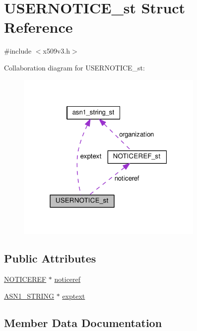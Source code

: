 \hypertarget{struct_u_s_e_r_n_o_t_i_c_e__st}{}\section{U\+S\+E\+R\+N\+O\+T\+I\+C\+E\+\_\+st Struct Reference}
\label{struct_u_s_e_r_n_o_t_i_c_e__st}


{\ttfamily \#include $<$x509v3.\+h$>$}



Collaboration diagram for U\+S\+E\+R\+N\+O\+T\+I\+C\+E\+\_\+st\+:
\nopagebreak
\begin{figure}[H]
\begin{center}
\leavevmode
\includegraphics[width=256pt]{struct_u_s_e_r_n_o_t_i_c_e__st__coll__graph}
\end{center}
\end{figure}
\subsection*{Public Attributes}
\begin{DoxyCompactItemize}
\item 
\hyperlink{x509v3_8h_a085bbf8ec1c144ee91fe543ea1fdd21a}{N\+O\+T\+I\+C\+E\+R\+EF} $\ast$ \hyperlink{struct_u_s_e_r_n_o_t_i_c_e__st_a5d1c9ae026549fc43f6443d1df42b956}{noticeref}
\item 
\hyperlink{ossl__typ_8h_ad37610875e38aa6c59f5e6e0b437e65c}{A\+S\+N1\+\_\+\+S\+T\+R\+I\+NG} $\ast$ \hyperlink{struct_u_s_e_r_n_o_t_i_c_e__st_a7009a63ef5ede50320b870f832a50ecd}{exptext}
\end{DoxyCompactItemize}


\subsection{Member Data Documentation}
